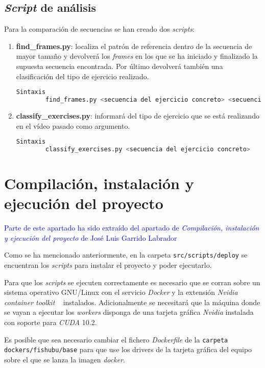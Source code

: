 \subsection{\textit{Script} de análisis}
Para la comparación de secuencias se han creado dos \textit{scripts}:
\begin{enumerate}
    \item \textbf{find\_frames.py}: localiza el patrón de referencia dentro de la secuencia de mayor tamaño y devolverá los \textit{frames} en los que se ha iniciado y finalizado la supuesta secuencia encontrada. Por último devolverá también una clasificación del tipo de ejercicio realizado.
    \begin{lstlisting}[language=Bash]
 Sintaxis
	    find_frames.py <secuencia del ejercicio concreto> <secuencia con varios ejercicios>
    \end{lstlisting}
    \item \textbf{classify\_exercises.py}: informará del tipo de ejercicio que se está realizando en el vídeo pasado como argumento.
    \begin{lstlisting}[language=Bash]
 Sintaxis
	    classify_exercises.py <secuencia del ejercicio concreto> 
    \end{lstlisting}
\end{enumerate}

\newpage
\section{Compilación, instalación y ejecución del proyecto}
\textcolor{blue}{Parte de este apartado ha sido extraído del apartado de \textit{Compilación, instalación y ejecución del proyecto} de José Luis Garrido Labrador}

Como se ha mencionado anteriormente, en la carpeta \texttt{src/scripts/deploy} se encuentran los \textit{scripts} para instalar el proyecto y poder ejecutarlo.

Para que los \textit{scripts} se ejecuten correctamente es necesario que se corran sobre un sistema operativo GNU/Linux con el servicio \textit{Docker} y la extensión \textit{Nvidia container toolkit} ~\cite{toolkitnvidiadocker} instalados. Adicionalmente se necesitará que la máquina donde se vayan a ejecutar los \textit{workers} disponga de una tarjeta gráfica \textit{Nvidia} instalada con soporte para \textit{CUDA} 10.2. 

Es posible que sea necesario cambiar el fichero \textit{Dockerfile} de la \texttt{carpeta dockers/fishubu/base} para que use los drivers de la tarjeta gráfica del equipo sobre el que se lanza la imagen \textit{docker}.



